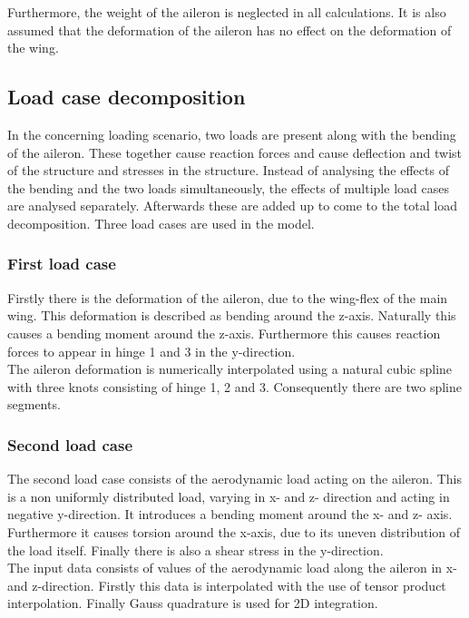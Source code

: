 \noindent Furthermore, the weight of the aileron is neglected in all calculations. It is also assumed that the deformation of the aileron has no effect on the deformation of the wing.

\subsection{Load case decomposition}
\label{subsec:load_decomposition}
In the concerning loading scenario, two loads are present along with the bending of the aileron. These together cause reaction forces and cause deflection and twist of the structure and stresses in the structure. Instead of analysing the effects of the bending and the two loads simultaneously, the effects of multiple load cases are analysed separately. Afterwards these are added up to come to the total load decomposition. Three load cases are used in the model.

\subsubsection{First load case}
\noindent Firstly there is the deformation of the aileron, due to the wing-flex of the main wing. This deformation is described as bending around the z-axis. Naturally this causes a bending moment around the z-axis. Furthermore this causes reaction forces to appear in hinge 1 and 3 in the y-direction.\\

\noindent The aileron deformation is numerically interpolated using a natural cubic spline with three knots consisting of hinge 1, 2 and 3. Consequently there are two spline segments.

\subsubsection{Second load case}
\noindent The second load case consists of the aerodynamic load acting on the aileron. This is a non uniformly distributed load, varying in x- and z- direction and acting in negative y-direction. It introduces a bending moment around the x- and z- axis. Furthermore it causes torsion around the x-axis, due to its uneven distribution of the load itself. Finally there is also a shear stress in the y-direction. \\

\noindent The input data consists of values of the aerodynamic load along the aileron in x- and z-direction. Firstly this data is interpolated with the use of tensor product interpolation. Finally Gauss quadrature is used for 2D integration.

